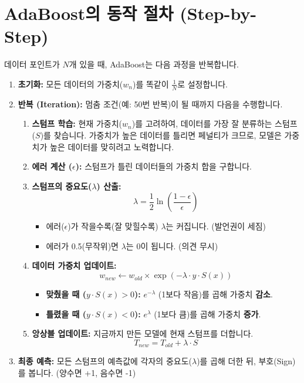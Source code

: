 \documentclass[11pt,a4paper]{book}
\theoremstyle{definition}
\begin{document}
\section{AdaBoost의 동작 절차 (Step-by-Step)}

데이터 포인트가 $N$개 있을 때, AdaBoost는 다음 과정을 반복합니다.

\begin{enumerate}
    \item \textbf{초기화:} 모든 데이터의 가중치($w_n$)를 똑같이 $\frac{1}{N}$로 설정합니다.
    
    \item \textbf{반복 (Iteration):} 멈춤 조건(예: 50번 반복)이 될 때까지 다음을 수행합니다.
    \begin{enumerate}
        \item \textbf{스텀프 학습:} 현재 가중치($w_n$)를 고려하여, 데이터를 가장 잘 분류하는 스텀프($S$)를 찾습니다. 가중치가 높은 데이터를 틀리면 페널티가 크므로, 모델은 가중치가 높은 데이터를 맞히려고 노력합니다.
        \item \textbf{에러 계산 ($\epsilon$):} 스텀프가 틀린 데이터들의 가중치 합을 구합니다.
        \item \textbf{스텀프의 중요도($\lambda$) 산출:} 
        \[ \lambda = \frac{1}{2} \ln \left( \frac{1 - \epsilon}{\epsilon} \right) \]
        \begin{itemize}
            \item 에러($\epsilon$)가 작을수록(잘 맞힐수록) $\lambda$는 커집니다. (발언권이 세짐)
            \item 에러가 0.5(무작위)면 $\lambda$는 0이 됩니다. (의견 무시)
        \end{itemize}
        \item \textbf{데이터 가중치 업데이트:}
        \[ w_{new} \leftarrow w_{old} \times \exp(-\lambda \cdot y \cdot S(x)) \]
        \begin{itemize}
            \item \textbf{맞췄을 때 ($y \cdot S(x) > 0$):} $e^{-\lambda}$ (1보다 작음)를 곱해 가중치 \textbf{감소}.
            \item \textbf{틀렸을 때 ($y \cdot S(x) < 0$):} $e^{\lambda}$ (1보다 큼)를 곱해 가중치 \textbf{증가}.
        \end{itemize}
        \item \textbf{앙상블 업데이트:} 지금까지 만든 모델에 현재 스텀프를 더합니다.
        \[ T_{new} = T_{old} + \lambda \cdot S \]
    \end{enumerate}
    
    \item \textbf{최종 예측:} 모든 스텀프의 예측값에 각자의 중요도($\lambda$)를 곱해 더한 뒤, 부호(Sign)를 봅니다. (양수면 +1, 음수면 -1)
\end{enumerate}
\end{document}
